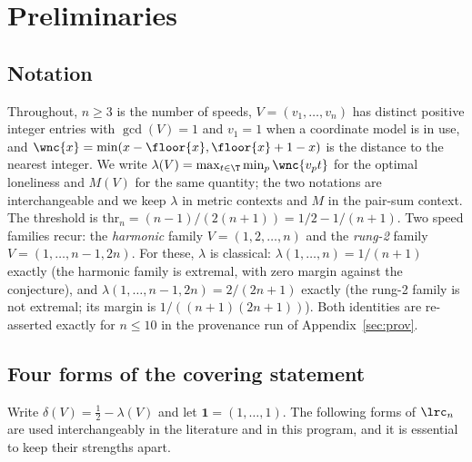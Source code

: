 
\section{Preliminaries}\label{sec:prelim}

\subsection{Notation}

Throughout, $n\ge 3$ is the number of speeds, $V=(v_1,\dots,v_n)$ has
distinct positive integer entries with $\gcd(V)=1$ and $v_1=1$ when a
coordinate model is in use, and $\wnc{x}=\min(x-\floor{x},
\floor{x}+1-x)$ is the distance to the nearest integer. We write
$\lambda(V)=\max_{t\in\T}\min_p \wnc{v_p t}$ for the optimal loneliness
and $M(V)$ for the same quantity; the two notations are interchangeable
and we keep $\lambda$ in metric contexts and $M$ in the
pair-sum context. The threshold is
$\mathrm{thr}_n=(n-1)/(2(n+1))=1/2-1/(n+1)$. Two speed families recur:
the \emph{harmonic} family $V=(1,2,\dots,n)$ and the \emph{rung-2}
family $V=(1,\dots,n-1,2n)$. For these, $\lambda$ is classical:
$\lambda(1,\dots,n)=1/(n+1)$ exactly (the harmonic family is extremal,
with zero margin against the conjecture), and
$\lambda(1,\dots,n-1,2n)=2/(2n+1)$ exactly (the rung-2 family is not
extremal; its margin is $1/((n+1)(2n+1))$). Both identities are
re-asserted exactly for $n\le 10$ in the provenance run of
Appendix~\ref{sec:prov}.

\subsection{Four forms of the covering statement}

Write $\delta(V)=\tfrac12-\lambda(V)$ and let $\mathbf{1}=(1,\dots,1)$.
The following forms of $\lrc_n$ are used interchangeably in the
literature and in this program, and it is essential to keep their
strengths apart.

